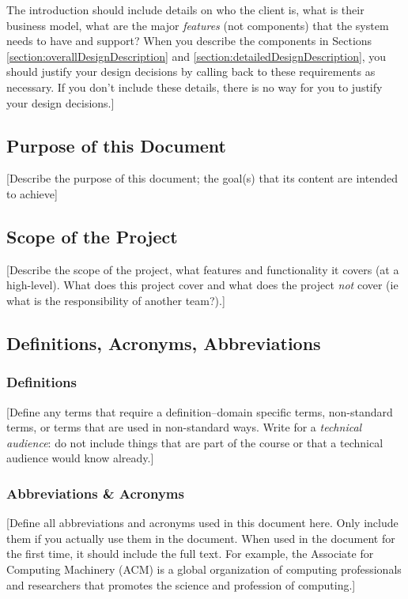 \documentclass[12pt]{scrartcl} %
\begin{document}
The introduction should include details on who the client is, what is their business
model, what are the major \emph{features} (not components) that the system needs to
have and support?  When you describe the components in Sections 
\ref{section:overallDesignDescription} and \ref{section:detailedDesignDescription}, 
you should justify your design decisions 
by calling back to these requirements as necessary.  If you don't include these
details, there is no way for you to justify your design decisions.]

\subsection{Purpose of this Document}

[Describe the purpose of this document; the goal(s) that its content are intended to achieve]

\subsection{Scope of the Project}

[Describe the scope of the project, what features and functionality it covers 
(at a high-level).  What does this project cover and what does the project 
\emph{not} cover (ie what is the responsibility of another team?).]

\subsection{Definitions, Acronyms, Abbreviations}

\subsubsection{Definitions}

[Define any terms that require a definition--domain specific terms, 
non-standard terms, or terms that are used in non-standard ways.  Write for
a \emph{technical audience}: do not include things that are part of the course
or that a technical audience would know already.]

\subsubsection{Abbreviations \& Acronyms}

[Define all abbreviations and acronyms used in this document here.  Only include
them if you actually use them in the document.  When used in the document for the
first time, it should include the full text.  For example, the Associate for Computing
Machinery (ACM) is a global organization of computing professionals and researchers 
that promotes the science and profession of computing.]
\end{document}
